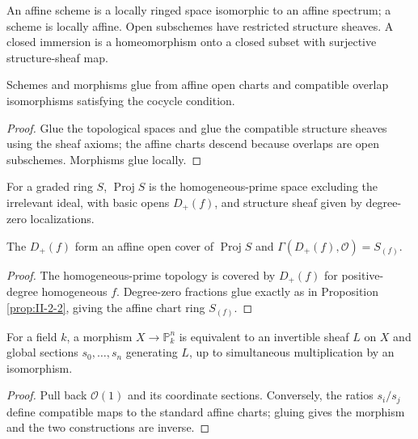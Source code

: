 \begin{definition}
\label{def:II-2-scheme}
An affine scheme is a locally ringed space isomorphic to an affine spectrum; a scheme is locally
affine. Open subschemes have restricted structure sheaves. A closed immersion is a homeomorphism
onto a closed subset with surjective structure-sheaf map.
\end{definition}

\begin{lemma}
\label{lem:II-2-4}
Schemes and morphisms glue from affine open charts and compatible overlap isomorphisms satisfying
the cocycle condition.
\end{lemma}
\begin{proof}
Glue the topological spaces and glue the compatible structure sheaves using the sheaf axioms;
the affine charts descend because overlaps are open subschemes. Morphisms glue locally.
\end{proof}

\begin{definition}[Proj]
\label{def:II-2-proj}
For a graded ring $S$, $\operatorname{Proj}S$ is the homogeneous-prime space excluding the irrelevant
ideal, with basic opens $D_+(f)$, and structure sheaf given by degree-zero localizations.
\end{definition}

\begin{proposition}
\label{prop:II-2-5}
The $D_+(f)$ form an affine open cover of $\operatorname{Proj}S$ and
$\Gamma(D_+(f),\mathcal O)=S_{(f)}$.
\end{proposition}
\begin{proof}
The homogeneous-prime topology is covered by $D_+(f)$ for positive-degree homogeneous $f$. Degree-zero
fractions glue exactly as in Proposition \ref{prop:II-2-2}, giving the affine chart ring $S_{(f)}$.
\end{proof}

\begin{proposition}
\label{prop:II-2-6}
For a field $k$, a morphism $X\to\mathbb P^n_k$ is equivalent to an invertible sheaf $L$ on $X$ and
global sections $s_0,\ldots,s_n$ generating $L$, up to simultaneous multiplication by an isomorphism.
\end{proposition}
\begin{proof}
Pull back $\mathcal O(1)$ and its coordinate sections. Conversely, the ratios $s_i/s_j$ define compatible
maps to the standard affine charts; gluing gives the morphism and the two constructions are inverse.
\end{proof}

